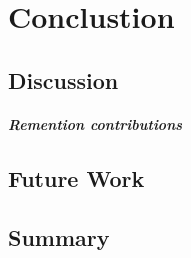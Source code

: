 \chapter{Conclustion}\label{\positionnumber}

\section{Discussion}\label{\positionnumber}
\paragraph{Remention contributions}
\section{Future Work}\label{\positionnumber}
\section{Summary}\label{\positionnumber}
